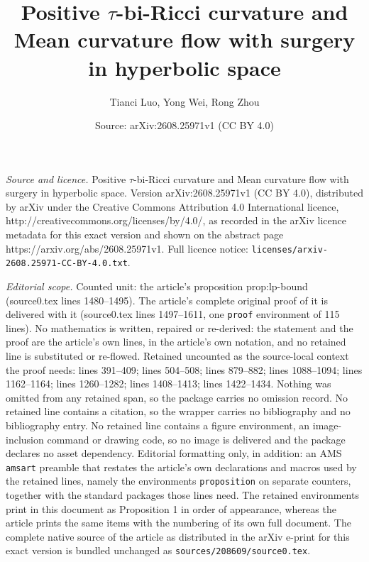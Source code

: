 \documentclass[10pt,a4paper]{amsart}
\title{Positive \texorpdfstring{$\tau$}{tau}-bi-Ricci curvature and Mean curvature flow with surgery in hyperbolic space}
\author{Tianci Luo, Yong Wei, Rong Zhou}
\date{Source: arXiv:2608.25971v1 (CC BY 4.0)}
\begin{document}
\maketitle

\noindent\emph{Source and licence.} Positive \texorpdfstring{$\tau$}{tau}-bi-Ricci curvature and Mean curvature flow with surgery in hyperbolic space. Version arXiv:2608.25971v1 (CC BY 4.0), distributed by arXiv under the Creative Commons Attribution 4.0 International licence, http://creativecommons.org/licenses/by/4.0/, as recorded in the arXiv licence metadata for this exact version and shown on the abstract page https://arxiv.org/abs/2608.25971v1. Full licence notice: \texttt{licenses/arxiv-2608.25971-CC-BY-4.0.txt}.\par\smallskip

\noindent\textit{Editorial scope.} Counted unit: the article's proposition prop:lp-bound (source0.tex lines 1480--1495). The article's complete original proof of it is delivered with it (source0.tex lines 1497--1611, one \texttt{proof} environment of 115 lines). No mathematics is written, repaired or re-derived: the statement and the proof are the article's own lines, in the article's own notation, and no retained line is substituted or re-flowed.  Retained uncounted as the source-local context the proof needs: lines 391--409; lines 504--508; lines 879--882; lines 1088--1094; lines 1162--1164; lines 1260--1282; lines 1408--1413; lines 1422--1434.  Nothing was omitted from any retained span, so the package carries no omission record.  No retained line contains a citation, so the wrapper carries no bibliography and no bibliography entry.  No retained line contains a figure environment, an image-inclusion command or drawing code, so no image is delivered and the package declares no asset dependency.  Editorial formatting only, in addition: an AMS \texttt{amsart} preamble that restates the article's own declarations and macros used by the retained lines, namely the environments \texttt{proposition} on separate counters, together with the standard packages those lines need.  The retained environments print in this document as Proposition 1 in order of appearance, whereas the article prints the same items with the numbering of its own full document.  The complete native source of the article as distributed in the arXiv e-print for this exact version is bundled unchanged as \texttt{sources/208609/source0.tex}.
\end{document}
